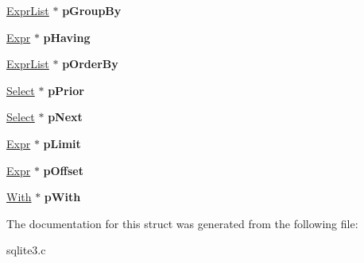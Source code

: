 \begin{DoxyCompactItemize}
\item 
\hyperlink{structExprList}{Expr\+List} $\ast$ {\bfseries p\+Group\+By}\hypertarget{structSelect_a5b625c7495468ae56ca2f214a76231a0}{}\label{structSelect_a5b625c7495468ae56ca2f214a76231a0}

\item 
\hyperlink{structExpr}{Expr} $\ast$ {\bfseries p\+Having}\hypertarget{structSelect_ad09e0b115e6e1599e3075b87dfa6e66e}{}\label{structSelect_ad09e0b115e6e1599e3075b87dfa6e66e}

\item 
\hyperlink{structExprList}{Expr\+List} $\ast$ {\bfseries p\+Order\+By}\hypertarget{structSelect_a73c474cd4a9a9b9aa4e3187d8bf2d886}{}\label{structSelect_a73c474cd4a9a9b9aa4e3187d8bf2d886}

\item 
\hyperlink{structSelect}{Select} $\ast$ {\bfseries p\+Prior}\hypertarget{structSelect_a51d1a253b0aba5a54b11b3bf3896d056}{}\label{structSelect_a51d1a253b0aba5a54b11b3bf3896d056}

\item 
\hyperlink{structSelect}{Select} $\ast$ {\bfseries p\+Next}\hypertarget{structSelect_a96aa0caf60390b8f5e88589639205c40}{}\label{structSelect_a96aa0caf60390b8f5e88589639205c40}

\item 
\hyperlink{structExpr}{Expr} $\ast$ {\bfseries p\+Limit}\hypertarget{structSelect_a11d3b48d04d58be818cdefb10aa061a0}{}\label{structSelect_a11d3b48d04d58be818cdefb10aa061a0}

\item 
\hyperlink{structExpr}{Expr} $\ast$ {\bfseries p\+Offset}\hypertarget{structSelect_aeaf016a10203b911000354122562fb46}{}\label{structSelect_aeaf016a10203b911000354122562fb46}

\item 
\hyperlink{structWith}{With} $\ast$ {\bfseries p\+With}\hypertarget{structSelect_a3ab5597bdc6b219ea03a6aca93260e9f}{}\label{structSelect_a3ab5597bdc6b219ea03a6aca93260e9f}

\end{DoxyCompactItemize}


The documentation for this struct was generated from the following file\+:\begin{DoxyCompactItemize}
\item 
sqlite3.\+c\end{DoxyCompactItemize}
